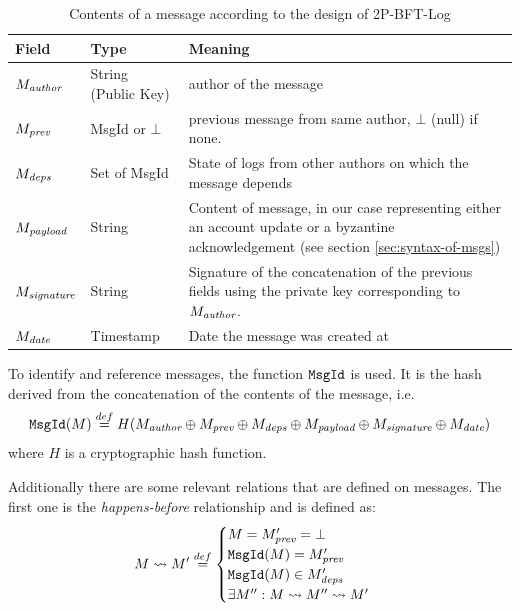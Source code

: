 \begin{table}
    \begin{tabular}{|l|l|p{5cm}|}
    \hline
    \textbf{Field} & \textbf{Type} & \textbf{Meaning}\\
    \hline
    $M_\emph{author}$ & String (Public Key) & author of the message \\
    $M_\emph{prev}$ & MsgId or $\bot$ & previous message from same author, $\bot$ (null) if none.\\
    $M_\emph{deps}$ & Set of MsgId & State of logs from other authors on which the message depends\\
    $M_\emph{payload}$ & String & Content of message, in our case representing either an account update or a byzantine acknowledgement (see section \ref{sec:syntax-of-msgs}) \\
    $M_\emph{signature}$ & String & Signature of the concatenation of the previous fields using the private key corresponding to $M_\emph{author}$.\\
    $M_\emph{date}$ & Timestamp & Date the message was created at \\
    \hline
    \end{tabular}
    \caption{Contents of a message according to the design of 2P-BFT-Log}
    \label{tab:2p-bft-log-msg-content}
\end{table}

To identify and reference messages, the function $\texttt{MsgId}$ is used.
It is the hash derived from the concatenation of the contents of the message, i.e.
\[
    \texttt{MsgId}(M) \stackrel{def}{=} H(M_\emph{author} \oplus M_\emph{prev} \oplus M_\emph{deps} \oplus M_\emph{payload} \oplus M_\emph{signature} \oplus M_\emph{date})
\]
where $H$ is a cryptographic hash function.

Additionally there are some relevant relations that are defined on messages.
The first one is the \emph{happens-before} relationship and is defined as:
\begin{equation}
    M \rightsquigarrow M' \stackrel{def}{=} \begin{cases}
        M = M'_\emph{prev} = \bot \\
        \texttt{MsgId}(M) = M'_\emph{prev} \\
        \texttt{MsgId}(M) \in M'_\emph{deps} \\
        \exists M'' : M \rightsquigarrow M'' \rightsquigarrow M'
    \end{cases}
    \label{eqn:happens-before}
\end{equation}

